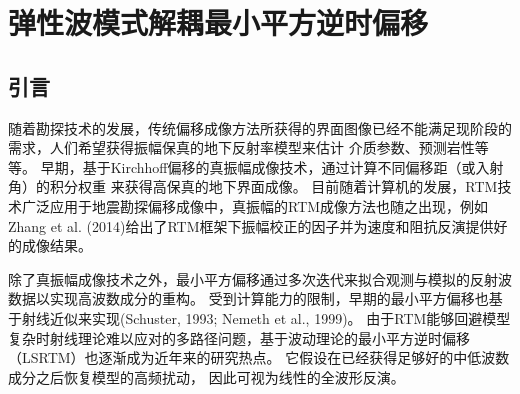 \chapter{弹性波模式解耦最小平方逆时偏移}
\label{cha:MD-ELSRTM}
\section{引言}
随着勘探技术的发展，传统偏移成像方法所获得的界面图像已经不能满足现阶段的需求，人们希望获得振幅保真的地下反射率模型来估计
介质参数、预测岩性等等。
早期，基于Kirchhoff偏移的真振幅成像技术，通过计算不同偏移距（或入射角）的积分权重
来获得高保真的地下界面成像\cite{BeylkinEtAl1985,Bleistein1987}。
目前随着计算机的发展，RTM技术广泛应用于地震勘探偏移成像中，真振幅的RTM成像方法也随之出现，例如
Zhang et al.
(2014)\cite{Zhang2014}给出了RTM框架下振幅校正的因子并为速度和阻抗反演提供好的成像结果。

除了真振幅成像技术之外，最小平方偏移通过多次迭代来拟合观测与模拟的反射波数据以实现高波数成分的重构。
受到计算能力的限制，早期的最小平方偏移也基于射线近似来实现(Schuster, 1993\cite{Schuster1993}; Nemeth
et al., 1999\cite{Nemeth1999})。
由于RTM能够回避模型复杂时射线理论难以应对的多路径问题，基于波动理论的最小平方逆时偏移（LSRTM）也逐渐成为近年来的研究热点。
它假设在已经获得足够好的中低波数成分之后恢复模型的高频扰动，
因此可视为线性的全波形反演。


